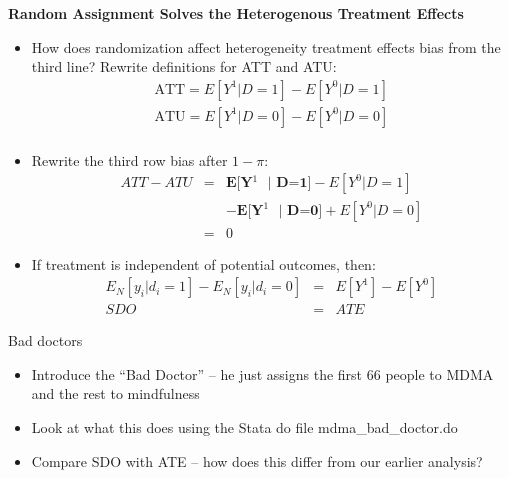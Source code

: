 \documentclass{beamer}
\begin{document}
\begin{frame}[shrink=20,plain]
  \begin{center}
    \textbf{Random Assignment Solves the Heterogenous Treatment Effects}
  \end{center}

  \begin{itemize}
    \item How does randomization affect heterogeneity treatment effects bias from the third line?  Rewrite definitions for ATT and ATU:\begin{eqnarray*}
            \text{ATT} = E[Y^1 | D=1] - E[Y^0 | D=1] \\
            \text{ATU} = E[Y^1 | D=0] - E[Y^0 | D=0] \\
          \end{eqnarray*}
    \item Rewrite the third row bias after $1-\pi$:\begin{eqnarray*}
            ATT - ATU &=& \textbf{E[Y$^1$ $|$ D=1]} - E[Y^0 | D=1] \\
            && - \textbf{E[Y$^1$ $|$ D=0]} + E[Y^0 | D=0] \\
            &=& 0
          \end{eqnarray*}
    \item If treatment is independent of potential outcomes, then:\begin{eqnarray*}
            E_N[y_i | d_i=1] - E_N[y_i | d_i=0]  &=& E[Y^1] - E[Y^0] \\
            SDO &=& ATE
          \end{eqnarray*}
  \end{itemize}
\end{frame}

\begin{frame}{Bad doctors}

\begin{itemize}
\item Introduce the ``Bad Doctor'' -- he just assigns the first 66 people to MDMA and the rest to mindfulness
\item Look at what this does using the Stata do file mdma\_bad\_doctor.do
\item Compare SDO with ATE -- how does this differ from our earlier analysis?
\end{itemize}

\end{frame}
\end{document}
